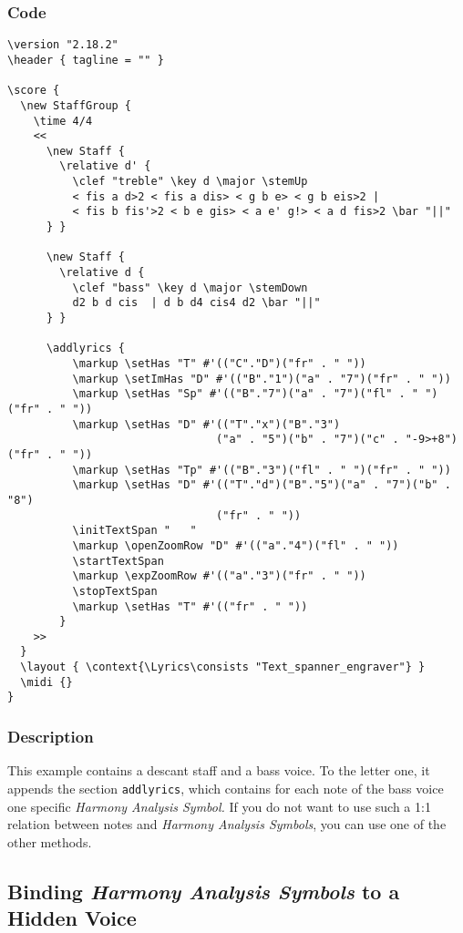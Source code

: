 \documentclass[
  DIV=calc,
  BCOR=5mm,
  12pt,
  headings=small,
  oneside,
  abstract=true,
  toc=bib,
  xcolor=dvipsnames,
  openany,
  english]{scrartcl}
\newcommand{\has}[1]{\textit{Harmony Analysis Symbol#1}}
\begin{document}
\subsubsection{Code}

\begin{scriptsize}
\begin{verbatim}
\version "2.18.2"
\header { tagline = "" }

\score {
  \new StaffGroup {
    \time 4/4
    <<
      \new Staff {
        \relative d' {
          \clef "treble" \key d \major \stemUp
          < fis a d>2 < fis a dis> < g b e> < g b eis>2 |
          < fis b fis'>2 < b e gis> < a e' g!> < a d fis>2 \bar "||"
      } }

      \new Staff {
        \relative d {
          \clef "bass" \key d \major \stemDown
          d2 b d cis  | d b d4 cis4 d2 \bar "||"
      } }

      \addlyrics {
          \markup \setHas "T" #'(("C"."D")("fr" . " "))
          \markup \setImHas "D" #'(("B"."1")("a" . "7")("fr" . " "))
          \markup \setHas "Sp" #'(("B"."7")("a" . "7")("fl" . " ")("fr" . " "))
          \markup \setHas "D" #'(("T"."x")("B"."3")
                                ("a" . "5")("b" . "7")("c" . "-9>+8")("fr" . " "))
          \markup \setHas "Tp" #'(("B"."3")("fl" . " ")("fr" . " "))
          \markup \setHas "D" #'(("T"."d")("B"."5")("a" . "7")("b" . "8")
                                ("fr" . " "))
          \initTextSpan "   "
          \markup \openZoomRow "D" #'(("a"."4")("fl" . " "))
          \startTextSpan
          \markup \expZoomRow #'(("a"."3")("fr" . " "))
          \stopTextSpan
          \markup \setHas "T" #'(("fr" . " "))
        }
    >>
  }
  \layout { \context{\Lyrics\consists "Text_spanner_engraver"} }
  \midi {}
}
\end{verbatim}
\end{scriptsize}

\subsubsection{Description}

This example contains a descant staff and a bass voice. To the letter one, it
appends the section \texttt{addlyrics}, which contains for each note of the bass
voice one specific \has. If you do not want to use such a 1:1 relation between
notes and \has{s}, you can use one of the other methods.

\subsection{Binding \has{s} to a Hidden Voice}
\label{HiddenVoice}
\end{document}
